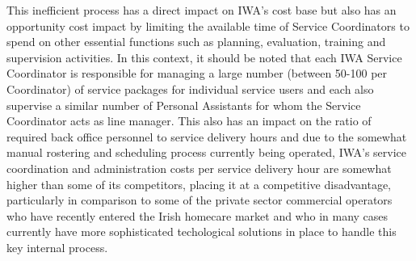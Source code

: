 \documentclass[a4paper,12pt]{article}
\begin{document}
\begin{samepage}
This inefficient process has a direct impact on IWA's cost base but also has an opportunity cost impact by limiting the available time of Service Coordinators to spend on other essential functions such as planning, evaluation, training and supervision activities. In this context, it should be noted that each IWA Service Coordinator is responsible for managing a large number (between 50-100 per Coordinator) of service packages for individual service users and each also supervise a similar number of Personal Assistants for whom the Service Coordinator acts as line manager. This also has an impact on the ratio of required back office personnel to service delivery hours and due to the somewhat manual rostering and scheduling process currently being operated,  IWA's service coordination and administration costs per service delivery hour are somewhat higher than some of its competitors, placing it at a competitive disadvantage, particularly in comparison to some of the private sector commercial operators who have recently entered the Irish homecare market and who in many cases currently have more sophisticated techological solutions in place to handle this key 
internal process.


\end{samepage}
\end{document}
